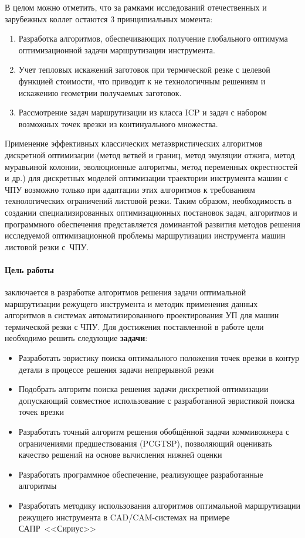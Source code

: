 В целом можно отметить,
что за рамками исследований отечественных и зарубежных коллег остаются 3 принципиальных момента:
\begin{enumerate}
    \item
    Разработка алгоритмов, обеспечивающих получение глобального оптимума
    оптимизационной задачи маршрутизации инструмента.
    \item
    Учет тепловых искажений заготовок при термической резке
    с целевой функцией стоимости, что приводит к не технологичным решениям
    и искажению геометрии получаемых заготовок.
    \item
    Рассмотрение задач маршрутизации из класса ICP
    и задач с набором возможных точек врезки из континуального множества.
\end{enumerate}

Применение эффективных классических метаэвристических алгоритмов дискретной оптимизации
(метод ветвей и границ, метод эмуляции отжига, метод муравьиной колонии, эволюционные алгоритмы, метод переменных окрестностей и др.)
для дискретных моделей оптимизации траектории инструмента машин с ЧПУ
возможно только при адаптации этих алгоритмов к требованиям технологических ограничений листовой резки.
Таким образом,
необходимость в создании специализированных оптимизационных постановок задач,
алгоритмов и программного обеспечения представляется
доминантой развития методов решения исследуемой оптимизационной проблемы
маршрутизации инструмента машин листовой резки с~ЧПУ.

\paragraph*{Цель работы}
заключается в разработке алгоритмов решения задачи оптимальной
маршрутизации режущего инструмента
и методик применения данных алгоритмов
в системах автоматизированного проектирования УП для машин термической резки с ЧПУ.
Для достижения поставленной в работе цели необходимо решить следующие
\textbf{задачи}:

\begin{itemize}
    \item
    Разработать эвристику поиска оптимального положения
    точек врезки в контур детали в процессе решения задачи
    непрерывной резки
    \item
    Подобрать алгоритм поиска решения задачи дискретной оптимизации
    допускающий совместное использование
    с разработанной эвристикой поиска точек врезки
    \item
    Разработать точный алгоритм решения
    обобщённой задачи коммивояжера
    с ограничениями предшествования (PCGTSP),
    позволяющий оценивать качество решений
    на основе вычисления нижней оценки
    \item
    Разработать программное обеспечение,
    реализующее разработанные алгоритмы
    \item
    Разработать методику использования алгоритмов
    оптимальной маршрутизации режущего инструмента
    в CAD/CAM-системах на примере САПР~<<Сириус>>
\end{itemize}

